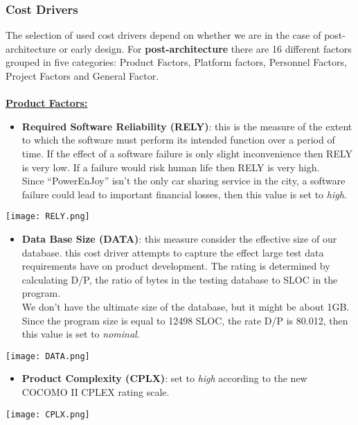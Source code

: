 \subsubsection{Cost Drivers}

The selection of used cost drivers depend on whether we are in the case of post-architecture or early design. For \textbf{post-architecture} there are 16 different factors grouped in five categories: Product Factors, Platform factors, Personnel Factors, Project Factors and General Factor.\\
\\
\textbf{\underline{Product Factors:}}

\begin{itemize}
	\item \textbf{Required Software Reliability (RELY)}: this is the measure of the extent to which the software must perform its intended function over a period of time. If the effect of a software failure is only slight inconvenience then RELY is very low. If a failure would risk human life then RELY is very high. \\ Since ``PowerEnJoy'' isn't the only car sharing service in the city, a software failure could lead to important financial losses, then this value is set to \textit{high}.
\end{itemize}
	\begin{center}
		\texttt{[image: RELY.png]}
	\end{center}

\begin{itemize}
	\item \textbf{Data Base Size (DATA)}: this measure consider the effective size of our database. this cost driver attempts to capture the effect large test data requirements have on product development. The rating is determined by calculating D/P, the ratio of bytes in the testing database to SLOC in the program. \\ We don't have the ultimate size of the database, but it might be about 1GB. Since the program size is equal to 12498 SLOC, the rate D/P is 80.012, then this value is set to \textit{nominal}. 
\end{itemize}
\begin{center}
	\texttt{[image: DATA.png]}
\end{center}

\begin{itemize}
	\item \textbf{Product Complexity (CPLX)}: set to \textit{high} according to the new COCOMO II CPLEX rating scale.
\end{itemize}
\begin{center}
	\texttt{[image: CPLX.png]}
\end{center}	

